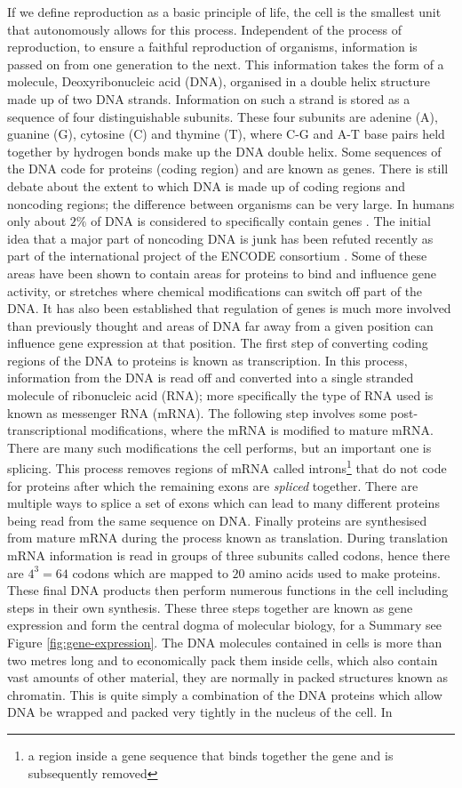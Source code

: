 If we define reproduction as a basic principle of life, the cell is the smallest unit that autonomously allows for this process. Independent of the process of reproduction, to ensure a faithful reproduction of organisms, information is passed on from one generation to the next. This information takes the form of a molecule, Deoxyribonucleic acid (DNA), organised in a double helix structure made up of two DNA strands. Information on such a strand is stored as a sequence of four distinguishable subunits. These four subunits are adenine (A), guanine (G), cytosine (C) and thymine (T), where C-G and A-T base pairs held together by hydrogen bonds make up the DNA double helix. Some sequences of the DNA code for proteins (coding region) and are known as genes.  There is still debate about the extent to which DNA is made up of coding regions and noncoding regions; the difference between organisms can be very large. In humans only about $2\%$ of DNA is considered to specifically contain genes \citep{Elgar:2008dm}. The initial idea that a major part of noncoding DNA is junk has been refuted recently as part of the international project of the ENCODE consortium \citep{Pennisi:2012wl}. Some of these areas have been shown to contain areas for proteins to bind and influence gene activity, or stretches where chemical modifications can  switch off part of the DNA. It has also been established that regulation of genes is much more involved than previously thought and areas of DNA far away from a given position can influence gene expression at that position. The first step of converting coding regions of the DNA to proteins is known as transcription. In this process, information from the DNA is read off and converted into a single stranded molecule of ribonucleic acid (RNA); more specifically the type of RNA used is known as messenger RNA (mRNA). The following step involves some post-transcriptional modifications, where the mRNA is modified to mature mRNA. There are many such modifications the cell performs, but an important one is splicing. This process removes regions of mRNA called introns\footnote{a region inside a gene sequence that binds together the gene and is subsequently removed} that do not code for proteins after which the remaining exons are \emph{spliced} together. There are multiple ways to splice a set of exons which can lead to many different proteins being read from the same sequence on DNA. Finally proteins are synthesised from mature mRNA during the process known as translation. During translation mRNA information is read in groups of three subunits called codons, hence there are $4^3 = 64$ codons which are mapped to $20$ amino acids used to make proteins. These final DNA products then perform numerous functions in the cell including steps in their own synthesis. These three steps together are known as gene expression and form the central dogma of molecular biology, for a Summary see Figure \ref{fig:gene-expression}. The DNA molecules contained in cells is more than two metres long and to economically pack them inside cells, which also contain vast amounts of other material, they are normally in packed structures known as chromatin. This is quite simply a combination of the DNA proteins which allow DNA be wrapped and packed very tightly in the nucleus of the cell. In 